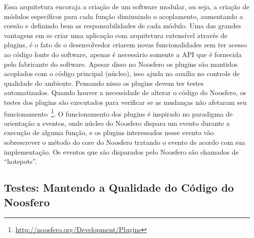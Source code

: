 Essa arquitetura encoraja a criação de um software modular, ou seja, a criação de módulos específicos para cada função diminuindo o acoplamento, aumentando a coesão e definindo bem as responsabilidades de cada módulo.  
%
Uma das grandes vantagens em se criar uma aplicação com arquitetura extensível através de plugins, é o fato de o desenvolvedor criarem novas funcionalidades sem ter acesso ao código fonte do software, apenas é necessário somente a API que é fornecida pelo fabricante do software. Apesar disso no Noosfero os plugins são mantidos acoplados com o código principal (núcleo), isso ajuda no auxílio no controle de qualidade do ambiente. Pensando nisso os plugins devem ter testes automatizados. Quando houver a necessidade de alterar o código do Noosfero, os testes dos plugins são executados para verificar se as mudanças não afetaram seu funcionamento~\footnote{\url{http://noosfero.org/Development/Plugins}}.
%
O funcionamento dos plugins é inspirado no paradigma de orientação a eventos, onde núcleo do Noosfero dispara um evento durante a execução de alguma função, e os plugins interessados nesse evento vão sobrescrever o método do core do Noosfero tratando o evento de acordo com sua implementação. Os eventos que são disparados pelo Noosfero são chamados de “hotspots”.

\subsection{Testes: Mantendo a Qualidade do Código do Noosfero}
\label{sub:arquiteturatestes}
